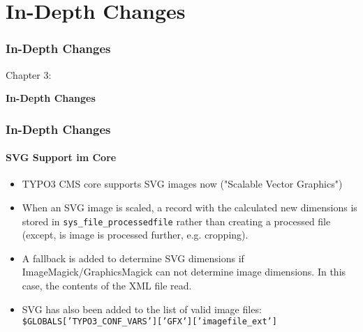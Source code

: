 %

\section{In-Depth Changes}
\begin{frame}[fragile]
	\frametitle{In-Depth Changes}

	\begin{center}\huge{Chapter 3:}\end{center}
	\begin{center}\huge{\color{typo3darkgrey}\textbf{In-Depth Changes}}\end{center}

\end{frame}

\begin{frame}[fragile]
	\frametitle{In-Depth Changes}
	\framesubtitle{SVG Support im Core}

	\begin{itemize}
		\item TYPO3 CMS core supports SVG images now ("Scalable Vector Graphics")

		\item When an SVG image is scaled, a record with the calculated new dimensions
			is stored in \texttt{sys\_file\_processedfile} rather than creating a
			processed file\newline
			\small(except, is image is processed further, e.g. cropping)\normalsize.

		\item A fallback is added to determine SVG dimensions if ImageMagick/GraphicsMagick
			can not determine image dimensions. In this case, the contents of the XML file
			read.

		\item SVG has also been added to the list of valid image files:\newline
			\texttt{\$GLOBALS['TYPO3\_CONF\_VARS']['GFX']['imagefile\_ext']}

	\end{itemize}

\end{frame}

